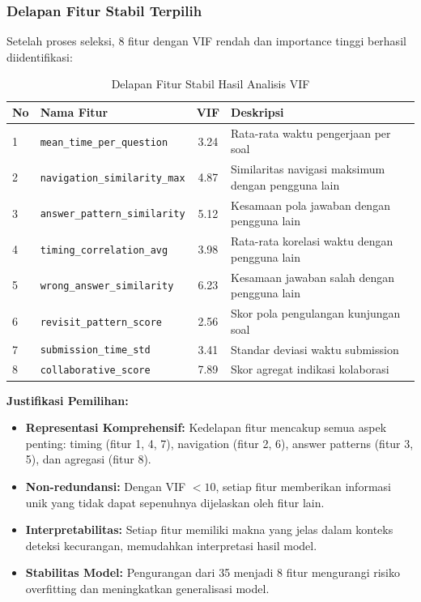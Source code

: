 \subsubsection{Delapan Fitur Stabil Terpilih}
Setelah proses seleksi, 8 fitur dengan VIF rendah dan importance tinggi berhasil diidentifikasi:

\begin{table}[htbp]
\centering
\caption{Delapan Fitur Stabil Hasil Analisis VIF}
\label{tabel:fiturStabil}
\begin{tabular}{|l|l|c|p{5cm}|}
\hline
\textbf{No} & \textbf{Nama Fitur} & \textbf{VIF} & \textbf{Deskripsi} \\
\hline
1 & \texttt{mean\_time\_per\_question} & 3.24 & Rata-rata waktu pengerjaan per soal \\
\hline
2 & \texttt{navigation\_similarity\_max} & 4.87 & Similaritas navigasi maksimum dengan pengguna lain \\
\hline
3 & \texttt{answer\_pattern\_similarity} & 5.12 & Kesamaan pola jawaban dengan pengguna lain \\
\hline
4 & \texttt{timing\_correlation\_avg} & 3.98 & Rata-rata korelasi waktu dengan pengguna lain \\
\hline
5 & \texttt{wrong\_answer\_similarity} & 6.23 & Kesamaan jawaban salah dengan pengguna lain \\
\hline
6 & \texttt{revisit\_pattern\_score} & 2.56 & Skor pola pengulangan kunjungan soal \\
\hline
7 & \texttt{submission\_time\_std} & 3.41 & Standar deviasi waktu submission \\
\hline
8 & \texttt{collaborative\_score} & 7.89 & Skor agregat indikasi kolaborasi \\
\hline
\end{tabular}
\end{table}

\textbf{Justifikasi Pemilihan:}
\begin{itemize}
    \item \textbf{Representasi Komprehensif:} Kedelapan fitur mencakup semua aspek penting: timing (fitur 1, 4, 7), navigation (fitur 2, 6), answer patterns (fitur 3, 5), dan agregasi (fitur 8).
    \item \textbf{Non-redundansi:} Dengan VIF $<10$, setiap fitur memberikan informasi unik yang tidak dapat sepenuhnya dijelaskan oleh fitur lain.
    \item \textbf{Interpretabilitas:} Setiap fitur memiliki makna yang jelas dalam konteks deteksi kecurangan, memudahkan interpretasi hasil model.
    \item \textbf{Stabilitas Model:} Pengurangan dari 35 menjadi 8 fitur mengurangi risiko overfitting dan meningkatkan generalisasi model.
\end{itemize}

